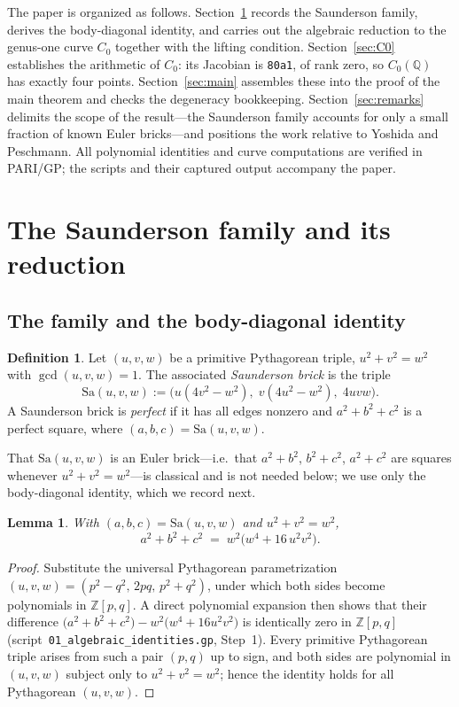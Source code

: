 \documentclass[11pt,reqno]{amsart}
\theoremstyle{plain}
\newtheorem{lemma}[theorem]{Lemma}
\theoremstyle{definition}
\newtheorem{definition}[theorem]{Definition}
\newcommand{\Q}{\mathbb{Q}}
\newcommand{\Z}{\mathbb{Z}}
\begin{document}
The paper is organized as follows. Section~\ref{sec:family} records the
Saunderson family, derives the body-diagonal identity, and carries out the
algebraic reduction to the genus-one curve $C_0$ together with the lifting
condition. Section~\ref{sec:C0} establishes the arithmetic of $C_0$: its
Jacobian is \texttt{80a1}, of rank zero, so $C_0(\Q)$ has exactly four points.
Section~\ref{sec:main} assembles these into the proof of the main theorem and
checks the degeneracy bookkeeping. Section~\ref{sec:remarks} delimits the scope
of the result---the Saunderson family accounts for only a small fraction of
known Euler bricks---and positions the work relative to Yoshida and Peschmann.
All polynomial identities and curve computations are verified in PARI/GP; the
scripts and their captured output accompany the paper.

\section{The Saunderson family and its reduction}\label{sec:family}

\subsection{The family and the body-diagonal identity}

\begin{definition}\label{def:saund}
Let $(u,v,w)$ be a primitive Pythagorean triple, $u^2+v^2=w^2$ with
$\gcd(u,v,w)=1$. The associated \emph{Saunderson brick} is the triple
\[
\mathrm{Sa}(u,v,w):=\bigl(u(4v^2-w^2),\;v(4u^2-w^2),\;4uvw\bigr).
\]
A Saunderson brick is \emph{perfect} if it has all edges nonzero and
$a^2+b^2+c^2$ is a perfect square, where $(a,b,c)=\mathrm{Sa}(u,v,w)$.
\end{definition}

That $\mathrm{Sa}(u,v,w)$ is an Euler brick---i.e.\ that $a^2+b^2$, $b^2+c^2$,
$a^2+c^2$ are squares whenever $u^2+v^2=w^2$---is classical and is not needed
below; we use only the body-diagonal identity, which we record next.

\begin{lemma}\label{lem:body}
With $(a,b,c)=\mathrm{Sa}(u,v,w)$ and $u^2+v^2=w^2$,
\[
a^2+b^2+c^2 \;=\; w^2\bigl(w^4+16\,u^2v^2\bigr).
\]
\end{lemma}

\begin{proof}
Substitute the universal Pythagorean parametrization
$(u,v,w)=(p^2-q^2,\,2pq,\,p^2+q^2)$, under which both sides become polynomials
in $\Z[p,q]$. A direct polynomial expansion then shows that their difference
$\bigl(a^2+b^2+c^2\bigr)-w^2\bigl(w^4+16u^2v^2\bigr)$ is identically zero in
$\Z[p,q]$ (script~\texttt{01\_algebraic\_identities.gp}, Step~1). Every
primitive Pythagorean triple arises from such a pair $(p,q)$ up to sign, and
both sides are polynomial in $(u,v,w)$ subject only to $u^2+v^2=w^2$; hence the
identity holds for all Pythagorean $(u,v,w)$.
\end{proof}
\end{document}
